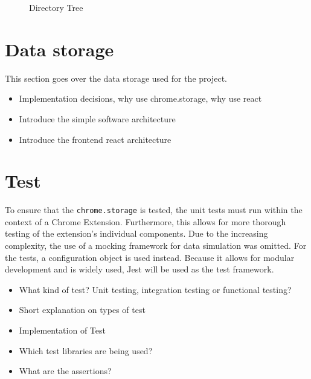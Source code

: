 \begin{figure}[ht!]
  \caption{Directory Tree}
  \label{directory_tree}
\end{figure}

\section{Data storage}
This section goes over the data storage used for the project.

\begin{itemize}
  \item Implementation decisions, why use chrome.storage, why use react
  \item Introduce the simple software architecture
  \item Introduce the frontend react architecture
\end{itemize}

\section{Test}
To ensure that the \texttt{chrome.storage} is tested, the unit tests must run within the context of a Chrome Extension. Furthermore, this allows for more thorough testing of the extension's individual components. Due to the increasing complexity, the use of a mocking framework for data simulation was omitted. For the tests, a configuration object is used instead. Because it allows for modular development and is widely used, Jest will be used as the test framework.
\begin{itemize}
  \item What kind of test? Unit testing, integration testing or functional testing?
  \item Short explanation on types of test
  \item Implementation of Test
  \item Which test libraries are being used?
  \item What are the assertions?
\end{itemize}

